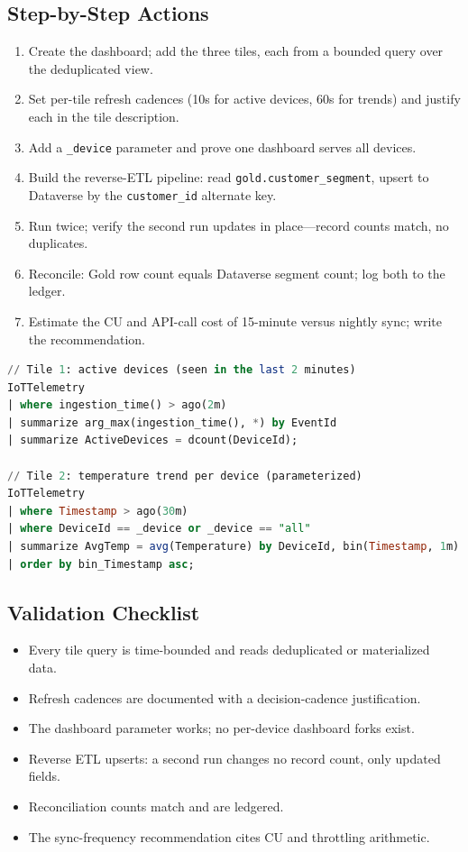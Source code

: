 \subsection{Step-by-Step Actions}
\begin{enumerate}
    \item Create the dashboard; add the three tiles, each from a bounded query over the deduplicated view.
    \item Set per-tile refresh cadences (10s for active devices, 60s for trends) and justify each in the tile description.
    \item Add a \texttt{\_device} parameter and prove one dashboard serves all devices.
    \item Build the reverse-ETL pipeline: read \texttt{gold.customer\_segment}, upsert to Dataverse by the \texttt{customer\_id} alternate key.
    \item Run twice; verify the second run updates in place---record counts match, no duplicates.
    \item Reconcile: Gold row count equals Dataverse segment count; log both to the ledger.
    \item Estimate the CU and API-call cost of 15-minute versus nightly sync; write the recommendation.
\end{enumerate}

\begin{lstlisting}[language=SQL,caption={Dashboard tile queries: bounded, deduplicated, parameterized.},label={lst:chapter16-tiles}]
// Tile 1: active devices (seen in the last 2 minutes)
IoTTelemetry
| where ingestion_time() > ago(2m)
| summarize arg_max(ingestion_time(), *) by EventId
| summarize ActiveDevices = dcount(DeviceId);

// Tile 2: temperature trend per device (parameterized)
IoTTelemetry
| where Timestamp > ago(30m)
| where DeviceId == _device or _device == "all"
| summarize AvgTemp = avg(Temperature) by DeviceId, bin(Timestamp, 1m)
| order by bin_Timestamp asc;
\end{lstlisting}

\subsection{Validation Checklist}
\begin{itemize}
    \item Every tile query is time-bounded and reads deduplicated or materialized data.
    \item Refresh cadences are documented with a decision-cadence justification.
    \item The dashboard parameter works; no per-device dashboard forks exist.
    \item Reverse ETL upserts: a second run changes no record count, only updated fields.
    \item Reconciliation counts match and are ledgered.
    \item The sync-frequency recommendation cites CU and throttling arithmetic.
\end{itemize}

